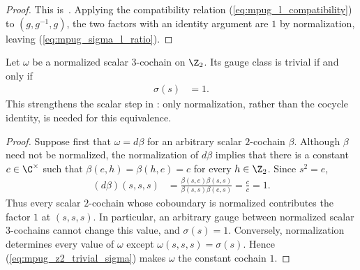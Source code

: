\begin{proof}\leanok
    This is~\cite[``Normalized $L$-symbol ratio'']{QICLean2026Blueprint}.
    Applying the compatibility relation
    (\ref{eq:mpug_l_compatibility}) to $(g,g^{-1},g)$, the two factors with an
    identity argument are $1$ by normalization, leaving
    (\ref{eq:mpug_sigma_l_ratio}).
\end{proof}

\begin{lemma}
    \label{thm:mpug_z2_trivial_scalar_class}
    \leanok
    Let $\omega$ be a normalized scalar $3$-cochain on $\Z_2$. Its gauge
    class is trivial if and only if
    \begin{align}
        \sigma(s) & =1.
        \label{eq:mpug_z2_trivial_sigma}
    \end{align}
    This strengthens the scalar step in
    \cite[lines~5339--5341]{FrancoRubio2025MPUGauging}: only normalization,
    rather than the cocycle identity, is needed for this equivalence.
\end{lemma}

\begin{proof}\leanok
    Suppose first that $\omega=d\beta$ for an arbitrary scalar $2$-cochain
    $\beta$. Although $\beta$ need not be normalized, the normalization of
    $d\beta$ implies that there is a constant $c\in\C^\times$ such that
    $\beta(e,h)=\beta(h,e)=c$ for every $h\in\Z_2$. Since $s^2=e$,
    \begin{align}
        (d\beta)(s,s,s)
         & =\frac{\beta(s,e)\beta(s,s)}
        {\beta(s,s)\beta(e,s)}=\frac{c}{c}=1.
        \label{eq:mpug_z2_coboundary_generator}
    \end{align}
    Thus every scalar $2$-cochain whose coboundary is normalized contributes
    the factor $1$ at $(s,s,s)$. In particular, an arbitrary gauge between
    normalized scalar $3$-cochains cannot change this value, and
    $\sigma(s)=1$. Conversely, normalization determines every
    value of $\omega$ except $\omega(s,s,s)=\sigma(s)$. Hence
    (\ref{eq:mpug_z2_trivial_sigma}) makes $\omega$ the constant cochain $1$.
\end{proof}

